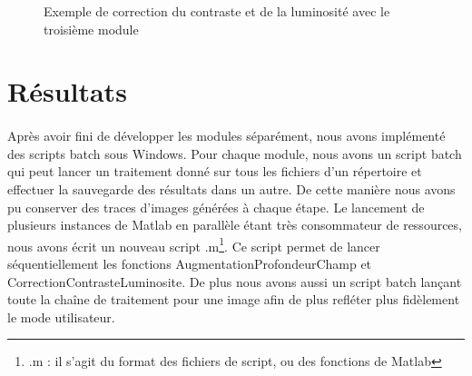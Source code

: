 \documentclass[11pt, french]{report-rd-info}
\begin{document}
\begin{figure}[htp]
 \centering
 \caption{Exemple de correction du contraste et de la luminosité avec le troisième module}
 \label{fig:ContExemple}
\end{figure}



\section{Résultats}
\paragraph*{}
Après avoir fini de développer les modules séparément, nous avons implémenté des scripts batch sous Windows. Pour chaque module, nous avons un script batch qui peut lancer un traitement donné sur tous les fichiers d'un répertoire et effectuer la sauvegarde des résultats dans un autre. De cette manière nous avons pu conserver des traces d'images générées à chaque étape. Le lancement de plusieurs instances de Matlab en parallèle étant très consommateur de ressources, nous avons écrit un nouveau script .m\footnote{.m : il s'agit du format des fichiers de script, ou des fonctions de Matlab}. Ce script permet de lancer séquentiellement les fonctions AugmentationProfondeurChamp et CorrectionContrasteLuminosite. De plus nous avons aussi un script batch lançant toute la chaîne de traitement pour une image afin de plus refléter plus fidèlement le mode utilisateur. 
\end{document}
